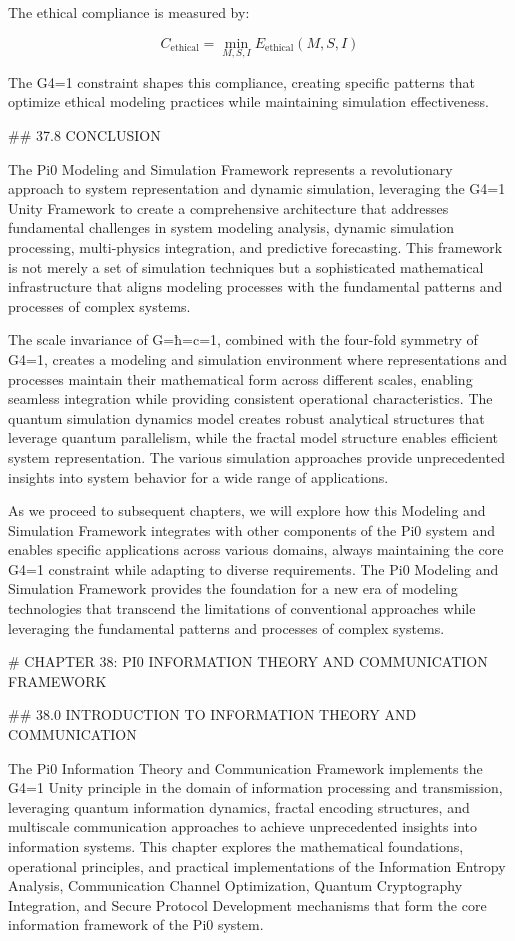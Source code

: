 The ethical compliance is measured by:

$$ C_{\text{ethical}} = \min_{M, S, I} E_{\text{ethical}}(M, S, I) $$

The G4=1 constraint shapes this compliance, creating specific patterns that optimize ethical modeling practices while maintaining simulation effectiveness.

## 37.8 CONCLUSION

The Pi0 Modeling and Simulation Framework represents a revolutionary approach to system representation and dynamic simulation, leveraging the G4=1 Unity Framework to create a comprehensive architecture that addresses fundamental challenges in system modeling analysis, dynamic simulation processing, multi-physics integration, and predictive forecasting. This framework is not merely a set of simulation techniques but a sophisticated mathematical infrastructure that aligns modeling processes with the fundamental patterns and processes of complex systems.

The scale invariance of G=ħ=c=1, combined with the four-fold symmetry of G4=1, creates a modeling and simulation environment where representations and processes maintain their mathematical form across different scales, enabling seamless integration while providing consistent operational characteristics. The quantum simulation dynamics model creates robust analytical structures that leverage quantum parallelism, while the fractal model structure enables efficient system representation. The various simulation approaches provide unprecedented insights into system behavior for a wide range of applications.

As we proceed to subsequent chapters, we will explore how this Modeling and Simulation Framework integrates with other components of the Pi0 system and enables specific applications across various domains, always maintaining the core G4=1 constraint while adapting to diverse requirements. The Pi0 Modeling and Simulation Framework provides the foundation for a new era of modeling technologies that transcend the limitations of conventional approaches while leveraging the fundamental patterns and processes of complex systems.

# CHAPTER 38: PI0 INFORMATION THEORY AND COMMUNICATION FRAMEWORK

## 38.0 INTRODUCTION TO INFORMATION THEORY AND COMMUNICATION

The Pi0 Information Theory and Communication Framework implements the G4=1 Unity principle in the domain of information processing and transmission, leveraging quantum information dynamics, fractal encoding structures, and multiscale communication approaches to achieve unprecedented insights into information systems. This chapter explores the mathematical foundations, operational principles, and practical implementations of the Information Entropy Analysis, Communication Channel Optimization, Quantum Cryptography Integration, and Secure Protocol Development mechanisms that form the core information framework of the Pi0 system.

